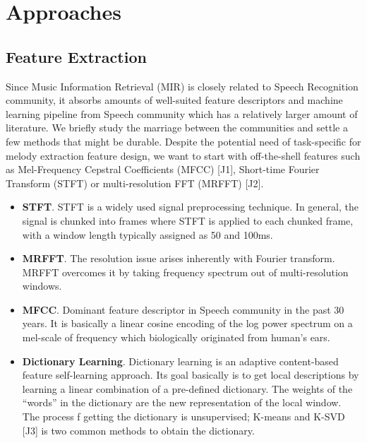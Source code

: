 \documentclass[12pt]{article}
\begin{document}
\section{Approaches}
\subsection{Feature Extraction}
Since Music Information Retrieval (MIR) is closely related to Speech Recognition community, it absorbs amounts of well-suited feature descriptors and 
machine learning pipeline from Speech community which has a relatively larger amount of literature.
We briefly study the marriage between the communities and settle a few methods that might be durable. 
Despite the potential need of task-specific for melody extraction feature design, we want to start with off-the-shell features such as Mel-Frequency Cepstral Coefficients (MFCC) [J1], Short-time Fourier Transform (STFT) or multi-resolution FFT (MRFFT) [J2].

\begin{itemize}
\item \textbf{STFT}. STFT is a widely used signal preprocessing technique. In general, the signal is chunked into frames where STFT is applied to each chunked frame, with a window length typically assigned as 50 and 100ms. 

\item \textbf{MRFFT}. The resolution issue arises inherently with Fourier transform. MRFFT overcomes it by taking frequency spectrum out of multi-resolution windows.

\item \textbf{MFCC}. Dominant feature descriptor in Speech community in the past 30 years. It is basically a linear cosine encoding of the log power spectrum on a mel-scale of frequency which biologically originated from human's ears. 

\item \textbf{Dictionary Learning}. Dictionary learning is an adaptive content-based feature self-learning approach. Its goal basically is to get local descriptions by learning a linear combination of a pre-defined dictionary. 
The weights of the “words” in the dictionary are the new representation of the local window. The process f getting the dictionary is unsupervised; K-means and K-SVD [J3] is two common methods to obtain the dictionary.
\end{itemize}
\end{document}

